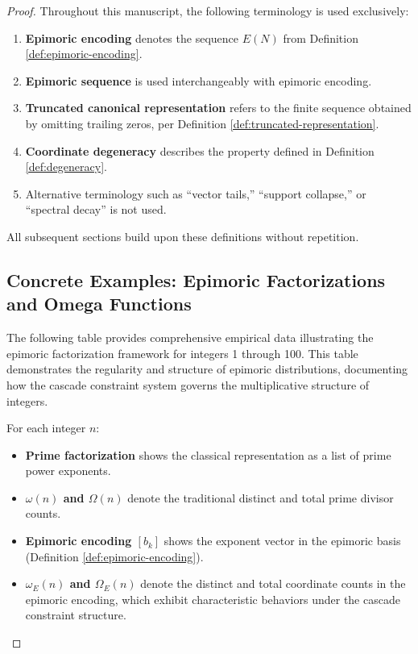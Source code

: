 \begin{proof}
Throughout this manuscript, the following terminology is used exclusively:
\begin{enumerate}
\item \textbf{Epimoric encoding} denotes the sequence $E(N)$ from Definition \ref{def:epimoric-encoding}.
\item \textbf{Epimoric sequence} is used interchangeably with epimoric encoding.
\item \textbf{Truncated canonical representation} refers to the finite sequence obtained by omitting trailing zeros, per Definition \ref{def:truncated-representation}.
\item \textbf{Coordinate degeneracy} describes the property defined in Definition \ref{def:degeneracy}.
\item Alternative terminology such as ``vector tails,'' ``support collapse,'' or ``spectral decay'' is not used.
\end{enumerate}

All subsequent sections build upon these definitions without repetition.

\subsection{Concrete Examples: Epimoric Factorizations and Omega Functions}
\label{subsec:epimoric-examples}

The following table provides comprehensive empirical data illustrating the epimoric factorization framework for integers 1 through 100. This table demonstrates the regularity and structure of epimoric distributions, documenting how the cascade constraint system governs the multiplicative structure of integers.

For each integer $n$:
\begin{itemize}
\item \textbf{Prime factorization} shows the classical representation as a list of prime power exponents.
\item \textbf{$\omega(n)$ and $\Omega(n)$} denote the traditional distinct and total prime divisor counts.
\item \textbf{Epimoric encoding $[b_k]$} shows the exponent vector in the epimoric basis (Definition \ref{def:epimoric-encoding}).
\item \textbf{$\omega_E(n)$ and $\Omega_E(n)$} denote the distinct and total coordinate counts in the epimoric encoding, which exhibit characteristic behaviors under the cascade constraint structure.
\end{itemize}


\end{proof}
